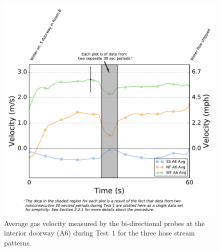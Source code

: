 \documentclass[12pt,oneside]{book}
\begin{document}
\begin{figure}[!ht]
	\includegraphics[width=\columnwidth]{../Figures/Plots/HOSE_IXXAXX_BDP_A6_stream_avgs}
	\caption[Average gas velocity through the interior doorway during Test~1 for the three hose stream patterns.]{Average gas velocity measured by the bi-directional probes at the interior doorway (A6) during Test~1 for the three hose stream patterns.}
	\label{fig:Test_1_BDP_A6_Avg_All}
\end{figure}
\FloatBarrier
\end{document}

